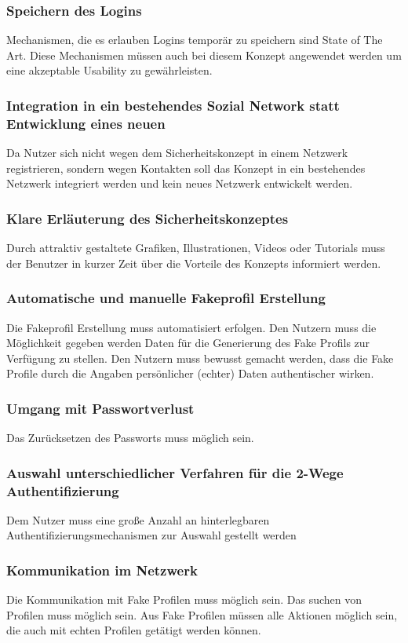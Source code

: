 \documentclass{sigchi}
\begin{document}
\subsubsection{Speichern des Logins}
Mechanismen, die es erlauben Logins temporär zu speichern sind State of The Art. Diese Mechanismen müssen auch bei diesem Konzept angewendet werden um eine akzeptable Usability zu gewährleisten.
\subsubsection{Integration in ein bestehendes Sozial Network statt Entwicklung eines neuen}
Da Nutzer sich nicht wegen dem Sicherheitskonzept in einem Netzwerk registrieren, sondern wegen Kontakten soll das Konzept in ein bestehendes Netzwerk integriert werden und kein neues Netzwerk entwickelt werden.
\subsubsection{Klare Erläuterung des Sicherheitskonzeptes}
Durch attraktiv gestaltete Grafiken, Illustrationen, Videos oder Tutorials muss der Benutzer in kurzer Zeit über die Vorteile des Konzepts informiert werden.
\subsubsection{Automatische und manuelle Fakeprofil Erstellung}
Die Fakeprofil Erstellung muss automatisiert erfolgen. Den Nutzern muss die Möglichkeit gegeben werden Daten für die Generierung des Fake Profils zur Verfügung zu stellen. Den Nutzern muss bewusst gemacht werden, dass die Fake Profile durch die Angaben persönlicher (echter) Daten authentischer wirken.
\subsubsection{Umgang mit Passwortverlust}
Das Zurücksetzen des Passworts muss möglich sein.
\subsubsection{Auswahl unterschiedlicher Verfahren für die 2-Wege Authentifizierung}
Dem Nutzer muss eine große Anzahl an hinterlegbaren Authentifizierungsmechanismen zur Auswahl gestellt werden
\subsubsection{Kommunikation im Netzwerk}
Die Kommunikation mit Fake Profilen muss möglich sein. Das suchen von Profilen muss möglich sein. Aus Fake Profilen müssen alle Aktionen möglich sein, die auch mit echten Profilen getätigt werden können.
\end{document}
